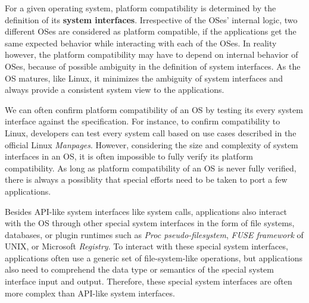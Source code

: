 For a given 
operating system, platform compatibility 
is determined by the definition of its {\bf system interfaces}.
Irrespective of the OSes' internal logic, two different OSes are considered as platform compatible, if the applications get the same expected behavior while interacting with each of the OSes.
In reality however, the platform compatibility may have to depend on internal behavior of OSes, because of possible ambiguity in the definition of system interfaces.
As the OS matures, like Linux, it minimizes the ambiguity of system interfaces
and always provide a consistent system view to the applications.

We can often confirm platform compatibility of an OS by testing its every system interface against the specification.
For instance, to confirm compatibility to Linux, developers can test every system call based on use cases described in the official Linux {\em Manpages}.
However, considering the size and complexity of system interfaces in an OS, it is often impossible to fully verify its platform compatibility.
As long as platform compatibility of an OS is never fully verified,
there is always a possiblity that special efforts need to be taken to port a few applications.

Besides API-like system interfaces like system calls,
applications also interact with the OS through other special system interfaces in the form of file systems, databases, or plugin runtimes such as {\em Proc pseudo-filesystem}, {\em FUSE framework} of UNIX, or  Microsoft \win{} {\em Registry}.
To interact with these special system interfaces, applications often use a generic set of file-system-like operations,
but applications also need to comprehend the data type or semantics of the special system interface input and output. 
Therefore, these special system interfaces are often more complex than API-like system interfaces.

